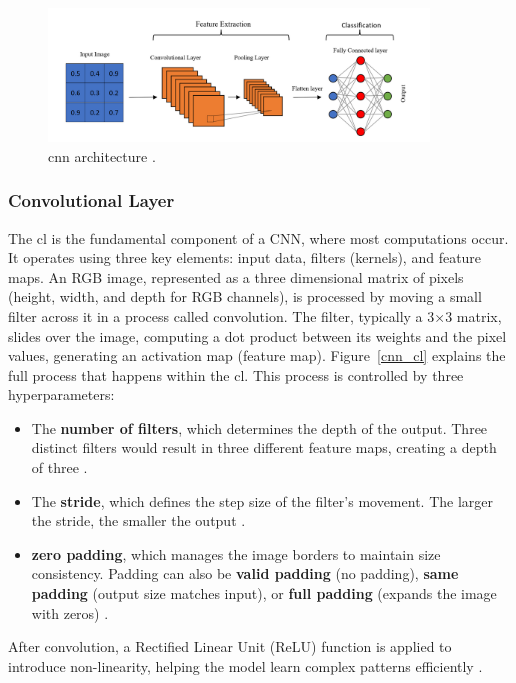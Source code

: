 \begin{figure}[!ht]
    \centering
    \includegraphics[width=0.9\textwidth]{Figures/Full_cnn.PNG} 
    \caption{\gls{cnn} architecture \cite{Full_CNN}.}
    \label{full_cnn}
\end{figure}

\subsubsection{Convolutional Layer}
The \gls{cl} is the fundamental component of a CNN, where most computations occur. It operates using three key elements: input data, filters (kernels), and feature maps. An RGB image, represented as a three dimensional matrix of pixels (height, width, and depth for RGB channels), is processed by moving a small filter across it in a process called convolution. The filter, typically a 3×3 matrix, slides over the image, computing a dot product between its weights and the pixel values, generating an activation map (feature map). Figure~\ref{cnn_cl} explains the full process that happens within the \gls{cl}. This process is controlled by three hyperparameters:
\begin{itemize}
    \item The \textbf{number of filters}, which determines the depth of the output. Three distinct filters would result in three different feature maps, creating a depth of three \cite{ibm_cnn}.
    \item The \textbf{stride}, which defines the step size of the filter's movement. The larger the stride, the smaller the output \cite{ibm_cnn}.
    \item \textbf{zero padding}, which manages the image borders to maintain size consistency. Padding can also be \textbf{valid padding} (no padding), \textbf{same padding} (output size matches input), or \textbf{full padding} (expands the image with zeros) \cite{ibm_cnn}.
\end{itemize}   
After convolution, a Rectified Linear Unit (ReLU) function is applied to introduce non-linearity, helping the model learn complex patterns efficiently \cite{ibm_cnn}.

